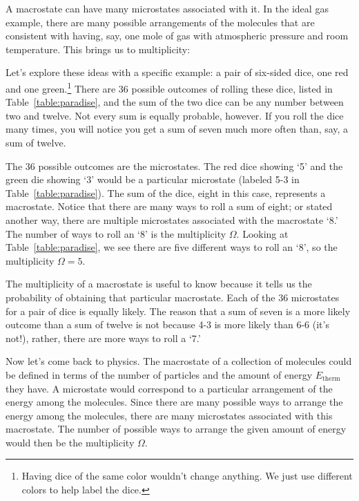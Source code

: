 A macrostate can have many microstates associated with it.  In the
ideal gas example, there are many possible arrangements of the
molecules that are consistent with having, say, one mole of gas with
atmospheric pressure and room temperature.  This brings us to
multiplicity:


Let's explore these ideas with a specific example: a pair of six-sided
dice, one red and one green.\footnote{Having dice of the same color
  wouldn't change anything.  We just use different colors to help
  label the dice.}  There are 36 possible outcomes of rolling these
dice, listed in Table~\ref{table:paradise}, and the sum of the two
dice can be any number between two and twelve.  Not every sum is
equally probable, however.   If you roll the dice many times, you will
notice you get a sum of seven much more often than, say, a sum of
twelve.

The 36 possible outcomes are the microstates.  The red dice showing
`5' and the green die showing `3' would be a particular microstate
(labeled 5-3 in Table~\ref{table:paradise}).  The sum of the dice,
eight in this case, represents a macrostate.  Notice that there are
many ways to roll a sum of eight; or stated another way, there are
multiple microstates associated with the macrostate `8.'  The number
of ways to roll an `8' is the multiplicity $\Omega$.  Looking at
Table~\ref{table:paradise}, we see there are five different ways to
roll an `8', so the multiplicity $\Omega =5$.

The multiplicity of a macrostate is useful to know because it tells us
the probability of obtaining that particular macrostate.  Each of the
36 microstates for a pair of dice is equally likely.  The reason that
a sum of seven is a more likely outcome than a sum of twelve is not
because 4-3 is more likely than 6-6 (it's not!), rather, there are
more ways to roll a `7.'

Now let's come back to physics.  The macrostate of a collection of
molecules  could be defined in terms of the number of particles and
the amount of energy $E_\text{therm}$ they have.  A microstate would
correspond to a particular arrangement of the energy among the
molecules.  Since there are many possible ways to arrange the energy
among the molecules, there are many microstates associated with this
macrostate.  The number of possible ways to arrange the given amount
of energy would then be the multiplicity $\Omega$.


